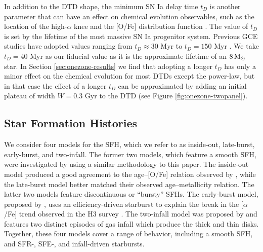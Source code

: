 \documentclass[twocolumn,twocolappendix,linenumbers]{aastex631}
\newcommand{\aFe}{[$\alpha$/Fe]\xspace}
\begin{document}
In addition to the DTD shape, the minimum SN Ia delay time $t_D$ is another parameter that can have an effect on chemical evolution observables, such as the location of the high-$\alpha$ knee and the [O/Fe] distribution function \citep[DF;][]{Andrews2017-ChemicalEvolution}. The value of $t_D$ is set by the lifetime of the most massive SN Ia progenitor system. Previous GCE studies have adopted values ranging from $t_D\approx30$ Myr \citep[e.g.,][]{Poulhazan2018-PrecisionPollution} to $t_D=150$ Myr . We take $t_D=40$ Myr as our fiducial value as it is the approximate lifetime of an $8\,{\rm M}_\odot$ star. In Section \ref{sec:onezone-results} we find that adopting a longer $t_D$ has only a minor effect on the chemical evolution for most DTDs except the power-law, but in that case the effect of a longer $t_D$ can be approximated by adding an initial plateau of width $W=0.3$ Gyr to the DTD (see Figure \ref{fig:onezone-twopanel}).

\subsection{Star Formation Histories}
\label{sec:sfh}

We consider four models for the SFH, which we refer to as inside-out, late-burst, early-burst, and two-infall. 
The former two models, which feature a smooth SFH, were investigated by  using a similar methodology to this paper. The inside-out model produced a good agreement to the age--[O/Fe] relation observed by \citet{Feuillet2019-MilkyWayAges}, while the late-burst model better matched their observed age--metallicity relation. The latter two models feature discontinuous or ``bursty'' SFHs. The early-burst model, proposed by \citet{Conroy2022-ThickDisk}, uses an efficiency-driven starburst to explain the break in the \aFe trend observed in the H3 survey \citep{Conroy2019-H3Survey}. The two-infall model was proposed by \citet{Chiappini1997-TwoInfall} and features two distinct episodes of gas infall which produce the thick and thin disks.
Together, these four models cover a range of behavior, including a smooth SFH, and SFR-, SFE-, and infall-driven starbursts.
\end{document}
